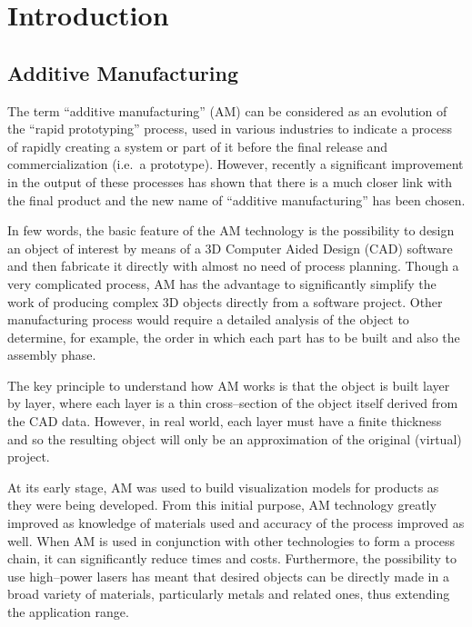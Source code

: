 
\chapter{Introduction}

\section{Additive Manufacturing}
The term ``additive manufacturing'' (AM) can be considered as an evolution of the ``rapid prototyping'' process, used in various industries to indicate a process of rapidly creating a system or part of it before the final release and commercialization (i.e.\ a prototype). However, recently a significant improvement in the output of these processes has shown that there is a much closer link with the final product and the new name of ``additive manufacturing'' has been chosen.

In few words, the basic feature of the AM technology is the possibility to design an object of interest by means of a 3D Computer Aided Design (CAD) software and then fabricate it directly with almost no need of process planning. Though a very complicated process, AM has the advantage to significantly simplify the work of producing complex 3D objects directly from a software project. Other manufacturing process would require a detailed analysis of the object to determine, for example, the order in which each part has to be built and also the assembly phase.

The key principle to understand how AM works is that the object is built layer by layer, where each layer is a thin cross--section of the object itself derived from the CAD data. However, in real world, each layer must have a finite thickness and so the resulting object will only be an approximation of the original (virtual) project.

At its early stage, AM was used to build visualization models for products as they were being developed. From this initial purpose, AM technology greatly improved as knowledge of materials used and accuracy of the process improved as well. When AM is used in conjunction with other technologies to form a process chain, it can significantly reduce times and costs. Furthermore, the possibility to use high--power lasers has meant that desired objects can be directly made in a broad variety of materials, particularly metals and related ones, thus extending the application range.

